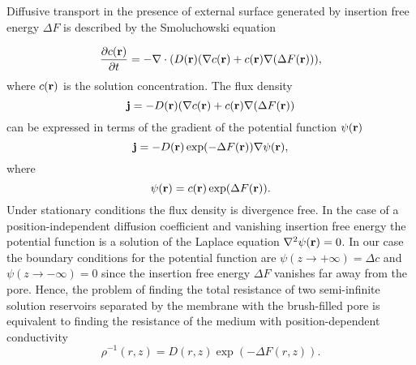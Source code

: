 \documentclass[12pt, a4paper]{article}
\begin{document}

Diffusive transport in the presence of external surface generated by insertion free energy $\Delta F$ is described by the Smoluchowski equation

\begin{equation}
    \frac{\partial c(\bold r)}{\partial t}=-{\bold \nabla}\cdot (D(\bold r)({\bold \nabla}c({\bold r})+c({\bold r}){\bold \nabla}(\Delta F({\bold  r}))),
    \label{eq:Smoluch}
\end{equation}
where $c(\bold r)$ is the solution concentration. The flux density 
\begin{equation}
    \bold j=- D(\bold r)({\bold \nabla}c({\bold r})+c({\bold r}){\bold \nabla}(\Delta F({\bold  r}))
    \label{eq:j}
\end{equation}
can be expressed in terms of the gradient of the potential function $\psi(\bold r)$
\begin{equation}
    \bold j=- D(\bold r) \exp(-\Delta F({\bold  r}))  {\bold \nabla} \psi(\bold r),
    \label{eq:psi}
\end{equation}
where
\begin{equation}
    \psi(\bold r)=c(\bold r)\exp(\Delta F(\bold r)).
    \label{eq:psi1}
\end{equation}
Under stationary conditions the flux density is divergence free. In the case of a position-independent diffusion coefficient and vanishing insertion free energy the potential function is a solution of the Laplace equation $\nabla^2 \psi(\bold r)=0$.
In our case the boundary conditions for the potential function are $\psi(z\rightarrow +\infty)=\Delta c$ and $\psi(z\rightarrow -\infty)=0$ since the insertion free energy $\Delta F$ vanishes far away from the pore.
Hence, the problem of finding the total resistance of two semi-infinite solution reservoirs separated by the membrane with the brush-filled pore is equivalent to finding the resistance of the medium with position-dependent conductivity 
\begin{equation}
    \rho^{-1} (r,z)= D(r,z)\exp(-\Delta F(r,z)).
    \label{eq:rho}
\end{equation}

\end{document}

